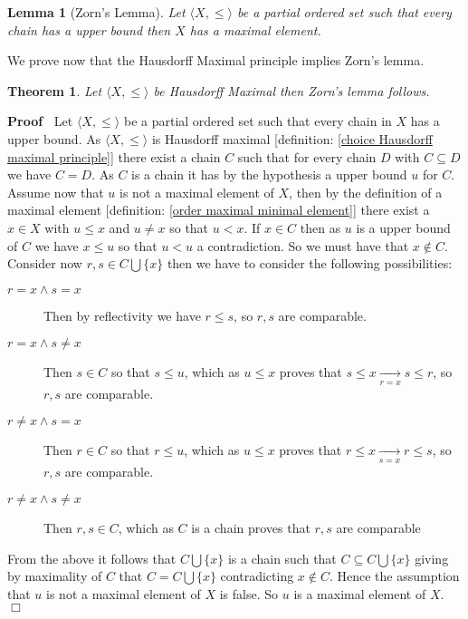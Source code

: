 \documentclass{book}
\newcommand{\Rightarrowlim}{\mathop{\rightarrow}\limits}
\newcommand{\nin}{\not\in}
\newenvironment{proof}{\noindent\textbf{Proof\ }}{\hspace*{\fill}$\Box$\medskip}
\newtheorem{lemma}{Lemma}
\newtheorem{theorem}{Theorem}
\begin{document}
\begin{lemma}[Zorn's Lemma]
  \label{choice Zorn's lemma}{}Let $\langle X, \leqslant
  \rangle$ be a partial ordered set such that every chain has a upper bound
  then $X$ has a maximal element.
\end{lemma}

We prove now that the Hausdorff Maximal principle implies Zorn's lemma.

\begin{theorem}
  \label{choice Hausdorff's implies Zorn's}Let $\langle X, \leqslant \rangle$
  be Hausdorff Maximal then Zorn's lemma follows.
\end{theorem}

\begin{proof}
  Let $\langle X, \leqslant \rangle$ be a partial ordered set such that every
  chain in $X$ has a upper bound. As $\langle X, \leqslant \rangle$ is
  Hausdorff maximal [definition: \ref{choice Hausdorff maximal principle}]
  there exist a chain $C$ such that for every chain $D$ with $C \subseteq D$
  we have $C = D$. As $C$ is a chain it has by the hypothesis a upper bound
  $u$ for $C$. Assume now that $u$ is not a maximal element of $X$, then by
  the definition of a maximal element [definition: \ref{order maximal minimal
  element}] there exist a $x \in X$ with $u \leqslant x$ and $u \neq x$ so
  that $u < x$. If $x \in C$ then as $u$ is a upper bound of $C$ we have $x
  \leqslant u$ so that $u < u$ a contradiction. So we must have that $x \nin
  C$. Consider now $r, s \in C \bigcup \{ x \}$ then we have to consider the
  following possibilities:
  \begin{description}
    \item[$r = x \wedge s = x$] Then by reflectivity we have $r \leqslant s$,
    so $r, s$ are comparable.
    
    \item[$r = x \wedge s \neq x$] Then $s \in C$ so that $s \leqslant u$,
    which as $u \leqslant x$ proves that $s \leqslant x \Rightarrowlim_{r = x}
    s \leqslant r$, so $r, s$ are comparable.
    
    \item[$r \neq x \wedge s = x$] Then $r \in C$ so that $r \leqslant u$,
    which as $u \leqslant x$ proves that $r \leqslant x \Rightarrowlim_{s = x}
    r \leqslant s$, so $r, s$ are comparable.
    
    \item[$r \neq x \wedge s \neq x$] Then $r, s \in C$, which as $C$ is a
    chain proves that $r, s$ are comparable
  \end{description}
  From the above it follows that $C \bigcup \{ x \}$ is a chain such that $C
  \subseteq C \bigcup \{ x \}$ giving by maximality of $C$ that $C = C \bigcup
  \{ x \}$ contradicting $x \nin C$. Hence the assumption that $u$ is not a
  maximal element of $X$ is false. So $u$ is a maximal element of $X$.
\end{proof}
\end{document}
